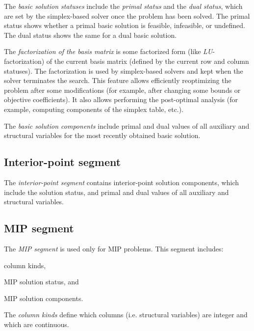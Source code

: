 The {\it basic solution statuses} include the {\it primal status} and
the {\it dual status}, which are set by the simplex-based solver once
the problem has been solved. The primal status shows whether a primal
basic solution is feasible, infeasible, or undefined. The dual status
shows the same for a dual basic solution.

The {\it factorization of the basis matrix} is some factorized form
(like {\it LU}-factorization) of the current basis matrix (defined by
the current row and column statuses). The factorization is used by
simplex-based solvers and kept when the solver terminates the search.
This feature allows efficiently reoptimizing the problem after some
modifications (for example, after changing some bounds or objective
coefficients). It also allows performing the post-optimal analysis (for
example, computing components of the simplex table, etc.).

The {\it basic solution components} include primal and dual values of
all auxiliary and structural variables for the most recently obtained
basic solution.

\subsection{Interior-point segment}

The {\it interior-point segment} contains interior-point solution
components, which include the solution status, and primal and dual
values of all auxiliary and structural variables.

\subsection{MIP segment}

The {\it MIP segment} is used only for MIP problems. This segment
includes:


\Item{---}column kinds,

\Item{---}MIP solution status, and

\Item{---}MIP solution components.


The {\it column kinds} define which columns (i.e. structural variables)
are integer and which are continuous.

